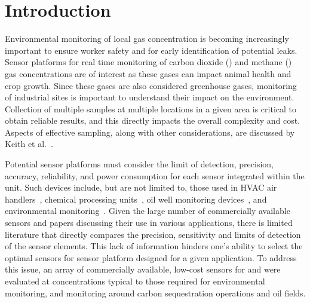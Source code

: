 \documentclass[sensors,article,submit,moreauthors,pdftex]{Definitions/mdpi}
\begin{document}
	
	\section{Introduction}
	\label{sec:intro}
		
		Environmental monitoring of local gas concentration is becoming increasingly important to ensure worker safety and for early identification of potential leaks.
		Sensor platforms for real time monitoring of carbon dioxide () and methane () gas concentrations are of interest as these gases can impact animal health and crop growth.
		Since these gases are also considered greenhouse gases, monitoring of industrial sites is important to understand their impact on the environment.
		Collection of multiple samples at multiple locations in a given area is critical to obtain reliable results, and this directly impacts the overall complexity and cost.
		Aspects of effective sampling, along with other considerations, are discussed by Keith et al.~\cite{keith_principles_1983}.
		
		Potential sensor platforms must consider the limit of detection, precision, accuracy, reliability, and power consumption for each sensor integrated within the unit.
		Such devices include, but are not limited to, those used in HVAC air handlers~\cite{yang_systematic_2014,chung_selective_2008}, chemical processing units~\cite{won_nonlinear_2012}, oil well monitoring devices~\cite{yi_remote_2010,somov_deployment_2013}, and environmental monitoring~\cite{pering_high_2014,black_formation_2012,guohua_study_2012,karunanithi_performance_2009,shendell_outdoor_2012}.
		Given the large number of commercially available sensors and papers discussing their use in various applications, there is limited literature that directly compares the precision, sensitivity and limits of detection of the sensor elements.
		This lack of information hinders one's ability to select the optimal sensors for sensor platform designed for a given application.
		To address this issue, an array of commercially available, low-cost sensors for  and  were evaluated at concentrations typical to those required for environmental monitoring, and monitoring around carbon sequestration operations and oil fields.
		
\end{document}
